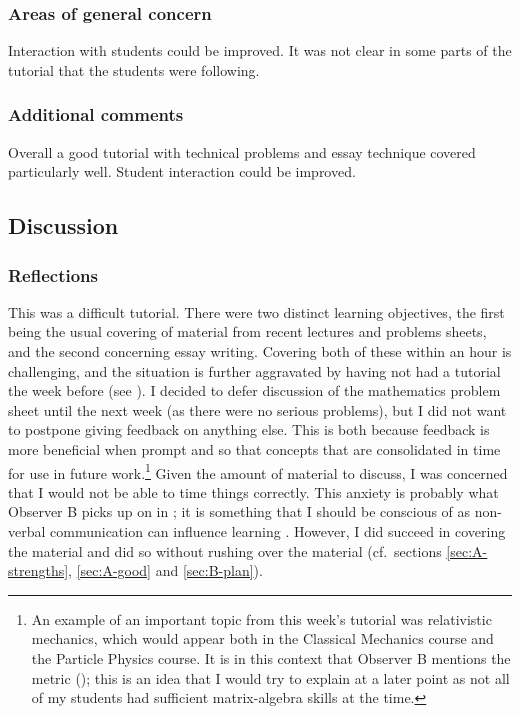 \subsubsection{Areas of general concern}\label{sec:B-concern}

Interaction with students could be improved. It was not clear in some parts of the tutorial that the students were following.

\subsubsection{Additional comments}

Overall a good tutorial with technical problems and essay technique covered particularly well. Student interaction could be improved.


\subsection{Discussion}\label{sec:me-discuss}

\subsubsection{Reflections}

This was a difficult tutorial. There were two distinct learning objectives, the first being the usual covering of material from recent lectures and problems sheets, and the second concerning essay writing. Covering both of these within an hour is challenging, and the situation is further aggravated by having not had a tutorial the week before (see ). I decided to defer discussion of the mathematics problem sheet until the next week (as there were no serious problems), but I did not want to postpone giving feedback on anything else. This is both because feedback is more beneficial when prompt \citep[chapter 4]{Gibbs2015,Jaques2007} and so that concepts that are consolidated in time for use in future work.\footnote{An example of an important topic from this week's tutorial was relativistic mechanics, which would appear both in the Classical Mechanics course and the Particle Physics course. It is in this context that Observer B mentions the metric (); this is an idea that I would try to explain at a later point as not all of my students had sufficient matrix-algebra skills at the time.} Given the amount of material to discuss, I was concerned that I would not be able to time things correctly. This anxiety is probably what Observer B picks up on in ; it is something that I should be conscious of as non-verbal communication can influence learning \citep[chapter 2]{Brown1988}. However, I did succeed in covering the material and did so without rushing over the material (cf.\ sections \ref{sec:A-strengths}, \ref{sec:A-good} and \ref{sec:B-plan}).


